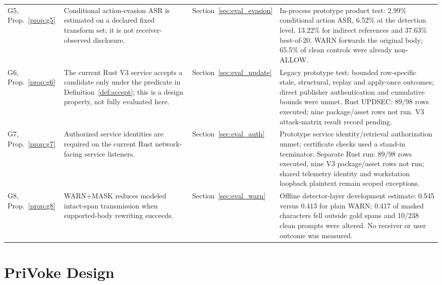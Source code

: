 \documentclass[sigconf]{acmart}
\theoremstyle{acmdefinition}\newtheorem{property}{Property}
\begin{document}
\begin{table}[t]
\begin{tabular}{p{}p{}p{}p{}}
G5, Prop.~\ref{prop:g5} & Conditional action-evasion ASR is estimated on a declared fixed transform set; it is not receiver-observed disclosure. & Section~\ref{sec:eval_evasion} & In-process prototype product test: 2.99\% conditional action ASR, 6.52\% at the detection level, 13.22\% for indirect references and 37.63\% best-of-20. WARN forwards the original body; 65.5\% of clean controls were already non-ALLOW. \\
G6, Prop.~\ref{prop:g6} & The current Rust V3 service accepts a candidate only under the predicate in Definition~\ref{def:accept}; this is a design property, not fully evaluated here. & Section~\ref{sec:eval_update} & Legacy prototype test: bounded row-specific stale, structural, replay and apply-once outcomes; direct publisher authentication and cumulative bounds were unmet. Rust UPDSEC: 89/98 rows executed; nine package/asset rows not run. V3 attack-matrix result record pending. \\
G7, Prop.~\ref{prop:g7} & Authorized service identities are required on the current Rust network-facing service listeners. & Section~\ref{sec:eval_auth} & Prototype service identity/retrieval authorization unmet; certificate checks used a stand-in terminator. Separate Rust run: 89/98 rows executed, nine V3 package/asset rows not run; shared telemetry identity and workstation loopback plaintext remain scoped exceptions. \\
G8, Prop.~\ref{prop:g8} & WARN+MASK reduces modeled intact-span transmission when supported-body rewriting succeeds. & Section~\ref{sec:eval_warn} & Offline detector-layer development estimate: 0.545 versus 0.413 for plain WARN; 0.417 of masked characters fell outside gold spans and 10/238 clean prompts were altered. No receiver or user outcome was measured. \\
\bottomrule
\end{tabular}
\end{table}

\section{PriVoke Design}
\label{sec:system_architecture}
\end{document}
